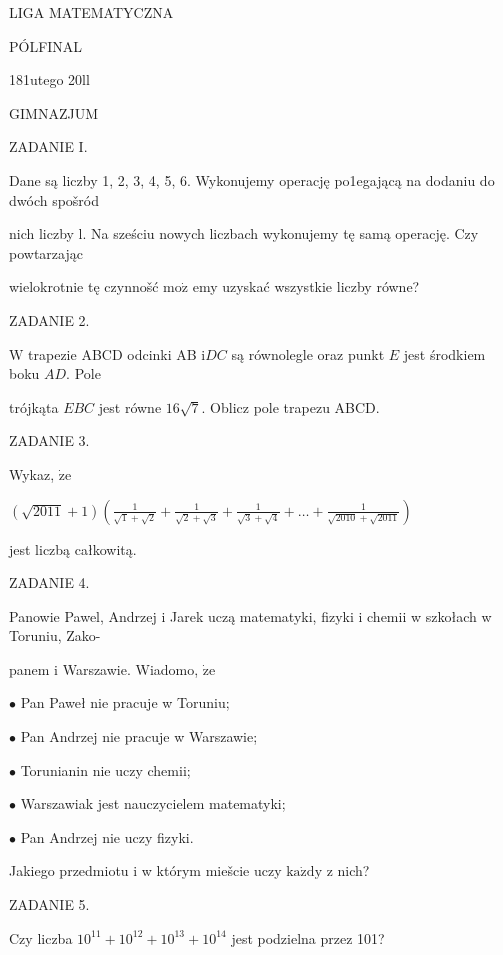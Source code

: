 \documentclass[a4paper,12pt]{article}
\begin{document}
LIGA MATEMATYCZNA

PÓLFINAL

181utego 20ll

GIMNAZJUM

ZADANIE I.

Dane są liczby 1, 2, 3, 4, 5, 6. Wykonujemy operację po1egającą na dodaniu do dwóch spošród

nich liczby l. Na sześciu nowych liczbach wykonujemy tę samą operację. Czy powtarzając

wielokrotnie tę czynnošć $\mathrm{m}\mathrm{o}\dot{\mathrm{z}}$ emy uzyskać wszystkie liczby równe?

ZADANIE 2.

$\mathrm{W}$ trapezie ABCD odcinki AB $\mathrm{i}DC$ są równolegle oraz punkt $E$ jest środkiem boku $AD$. Pole

trójkąta $EBC$ jest równe $16\sqrt{7}$. Oblicz pole trapezu ABCD.

ZADANIE 3.

Wykaz, $\dot{\mathrm{z}}\mathrm{e}$

$(\displaystyle \sqrt{2011}+1)(\frac{1}{\sqrt{1}+\sqrt{2}}+\frac{1}{\sqrt{2}+\sqrt{3}}+\frac{1}{\sqrt{3}+\sqrt{4}}+\ldots+\frac{1}{\sqrt{2010}+\sqrt{2011}})$

jest liczbą całkowitą.

ZADANIE 4.

Panowie Pawel, Andrzej i Jarek uczą matematyki, fizyki i chemii w szkołach w Toruniu, Zako-

panem i Warszawie. Wiadomo, $\dot{\mathrm{z}}\mathrm{e}$

$\bullet$ Pan Paweł nie pracuje w Toruniu;

$\bullet$ Pan Andrzej nie pracuje w Warszawie;

$\bullet$ Torunianin nie uczy chemii;

$\bullet$ Warszawiak jest nauczycielem matematyki;

$\bullet$ Pan Andrzej nie uczy fizyki.

Jakiego przedmiotu i w którym miešcie uczy $\mathrm{k}\mathrm{a}\dot{\mathrm{z}}\mathrm{d}\mathrm{y}$ z nich?

ZADANIE 5.

Czy liczba $10^{11}+10^{12}+10^{13}+10^{14}$ jest podzielna przez 101?
\end{document}
